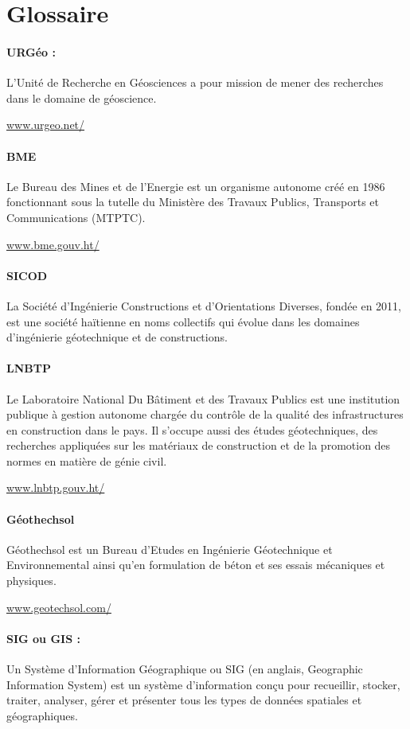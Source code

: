 \section{Glossaire}
\paragraph{URGéo :}
L'Unité de Recherche en Géosciences a pour mission de mener des
recherches dans le domaine de géoscience.
\par
\url{www.urgeo.net/}


\paragraph{BME}
Le Bureau des Mines et de l’Energie est un organisme autonome créé en 
1986 fonctionnant sous la tutelle du Ministère des Travaux Publics, Transports 
et Communications (MTPTC). 
\par
\url{www.bme.gouv.ht/}

\paragraph{SICOD}
La  Société d’Ingénierie Constructions et d’Orientations Diverses,
fondée en 2011, est une société haïtienne en noms collectifs qui évolue dans 
les domaines d’ingénierie géotechnique et de constructions.

\paragraph{LNBTP}
Le Laboratoire National Du Bâtiment et des Travaux Publics est une institution 
publique à gestion autonome chargée du contrôle de
la qualité des infrastructures en construction dans le pays. Il s'occupe 
aussi des études géotechniques, des recherches appliquées sur les matériaux de 
construction et de la promotion des normes en matière de génie civil.
\par
\url{www.lnbtp.gouv.ht/}


\paragraph{Géothechsol}
Géothechsol est un Bureau d’Etudes 
en Ingénierie Géotechni\-que et Environnemental
ainsi qu’en formulation de béton et ses essais mécani\-ques et physiques. 
\par
\url{www.geotechsol.com/}


\paragraph{SIG ou GIS :}  
Un Système d'Information Géographique ou SIG (en anglais, Geographic 
Information System) est un système d'information conçu pour 
recueillir, stocker, traiter, analyser, gérer et présenter tous les 
types de données spatiales et géographiques. 



